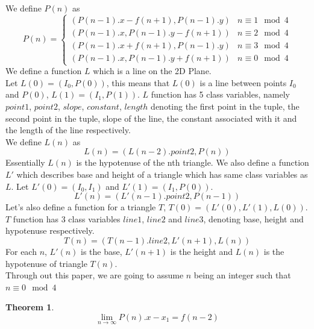 \documentclass[preprint,12pt]{elsarticle}
\newtheorem{theorem}{Theorem}[section]
\begin{document}
	We define $P(n)$ as
	\begin{equation*}
	P(n) = \begin{cases}
	(P(n - 1).x - f(n + 1), P(n - 1).y) & n \equiv 1\mod 4\\
	(P(n - 1).x, P(n - 1).y - f(n + 1)) & n \equiv 2\mod 4\\
	(P(n - 1).x + f(n + 1), P(n - 1).y) & n \equiv 3\mod 4\\
	(P(n - 1).x, P(n - 1).y + f(n + 1)) & n \equiv 0\mod 4
	\end{cases}
	\end{equation*}
	We define a function $L$ which is a line on the 2D Plane.\\
	Let $L(0) = (I_0, P(0))$, this means that $L(0)$ is a line between points $I_0$ and $P(0)$, $L(1) = (I_1, P(1))$. $L$ function has 5 class variables, namely $point1$, $point2$, $slope$, $constant$, $length$ denoting the first point in the tuple, the second point in the tuple, slope of the line, the constant associated with it and the length of the line respectively.\\
	We define $L(n)$ as $$L(n) = (L(n - 2).point2, P(n))$$ 
	Essentially $L(n)$ is the hypotenuse of the nth triangle.
	We also define a function $L'$ which describes base and height of a triangle which has same class variables as $L$.
	Let $L'(0) = (I_0, I_1)$ and $L'(1) = (I_1, P(0))$.
	$$L'(n) = (L'(n - 1).point2, P(n - 1))$$
	Let's also define a function for a triangle $T$, $T(0) = (L'(0), L'(1), L(0))$. $T$ function has 3 class variables $line1$, $line2$ and $line3$, denoting base, height and hypotenuse respectively.
	$$T(n) = (T(n - 1).line2, L'(n + 1), L(n))$$
	For each $n$, $L'(n)$ is the base, $L'(n + 1)$ is the height and $L(n)$ is the hypotenuse of triangle $T(n)$.\\
	Through out this paper, we are going to assume $n$ being an integer such that $n \equiv 0\mod4$
	\begin{theorem}
		\label{lim-P}
		$$\lim_{n \to \infty} P(n).x - x_1 = f(n - 2)$$
	\end{theorem}
\end{document}
